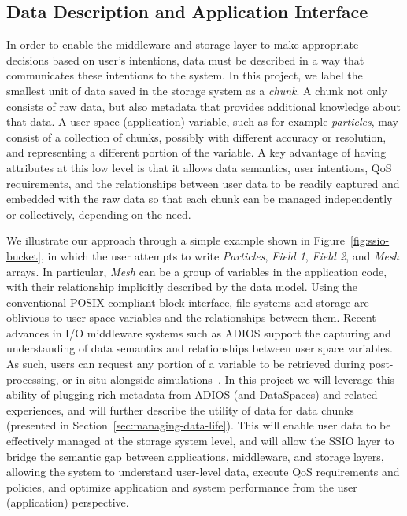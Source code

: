 \subsection{Data Description and Application Interface}
\label{sec:data-description}
In order to enable the middleware and storage layer to make appropriate decisions based on user's intentions, data must be
described in a way that communicates these intentions to
the system. In this project, we label the smallest unit of data
saved in the storage system as a \textit{chunk}.  A chunk not only consists of 
raw data, but also metadata that provides additional
knowledge about that data.
A user space (application) variable, such as for example \textit{particles}, may
consist of a collection of chunks, possibly with different accuracy or
resolution, and representing a different portion of the variable.
A key advantage of having attributes at this low level is that it allows data
semantics, user intentions, QoS requirements, and the relationships between user
data to be readily captured and embedded with the raw data so that each chunk
can be managed independently or collectively, depending on the need.

  We illustrate our approach through a simple example shown in Figure~\ref{fig:ssio-bucket},
  in which the user attempts to write \textit{Particles}, \textit{Field 1},
  \textit{Field 2}, and \textit{Mesh} arrays. In particular, \textit{Mesh} can be a group
  of variables in the application code, with their relationship implicitly described
  by the data model. Using the conventional POSIX-compliant block interface, file
  systems and storage are oblivious to user space variables and the relationships between
  them. Recent advances in I/O middleware systems such as ADIOS \cite{liu_helloadios}
  support the capturing and understanding of data semantics and relationships between  
  user space variables. As such, users can request any portion of a variable to be retrieved
  during post-processing, or in situ alongside simulations~\cite{docan2012dataspaces}. 
  In this project we will leverage this ability of plugging rich metadata from ADIOS (and 
  DataSpaces) and related experiences, and will further describe the utility of data for data 
  chunks (presented in Section~\ref{sec:managing-data-life}). This will enable user data to 
  be effectively managed at the storage system level, and will allow the SSIO layer to 
%  
%   
bridge the semantic gap between applications, middleware, and storage layers, allowing the 
system to understand user-level data, execute QoS requirements and policies, and optimize 
application and system performance from the user (application) perspective.

